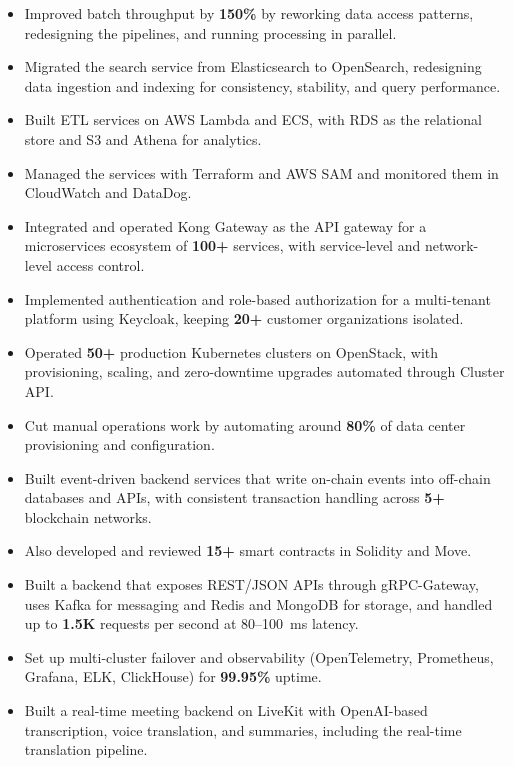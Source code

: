 \begin{itemize}
    \item Improved batch throughput by \textbf{150\%} by reworking data access patterns, redesigning the pipelines, and running processing in parallel. %
    \item Migrated the search service from Elasticsearch to OpenSearch, redesigning data ingestion and indexing for consistency, stability, and query performance. %
    \item Built ETL services on AWS Lambda and ECS, with RDS as the relational store and S3 and Athena for analytics. %
    \item Managed the services with Terraform and AWS SAM and monitored them in CloudWatch and DataDog. %
\end{itemize}

\begin{itemize}
    \item Integrated and operated Kong Gateway as the API gateway for a microservices ecosystem of \textbf{100+} services, with service-level and network-level access control. %
    \item Implemented authentication and role-based authorization for a multi-tenant platform using Keycloak, keeping \textbf{20+} customer organizations isolated. %
    \item Operated \textbf{50+} production Kubernetes clusters on OpenStack, with provisioning, scaling, and zero-downtime upgrades automated through Cluster API. %
    \item Cut manual operations work by automating around \textbf{80\%} of data center provisioning and configuration. %
\end{itemize}

\jobEsolLabs
\begin{itemize}
    \item Built event-driven backend services that write on-chain events into off-chain databases and APIs, with consistent transaction handling across \textbf{5+} blockchain networks. %
    \item Also developed and reviewed \textbf{15+} smart contracts in Solidity and Move. %
\end{itemize}


\projDattingQ
\begin{itemize}
    \item Built a backend that exposes REST/JSON APIs through gRPC-Gateway, uses Kafka for messaging and Redis and MongoDB for storage, and handled up to \textbf{1.5K} requests per second at 80--100~ms latency. %
    \item Set up multi-cluster failover and observability (OpenTelemetry, Prometheus, Grafana, ELK, ClickHouse) for \textbf{99.95\%} uptime. %
\end{itemize}

\projMeetQ
\begin{itemize}
    \item Built a real-time meeting backend on LiveKit with OpenAI-based transcription, voice translation, and summaries, including the real-time translation pipeline. %
\end{itemize}

\cveducation


